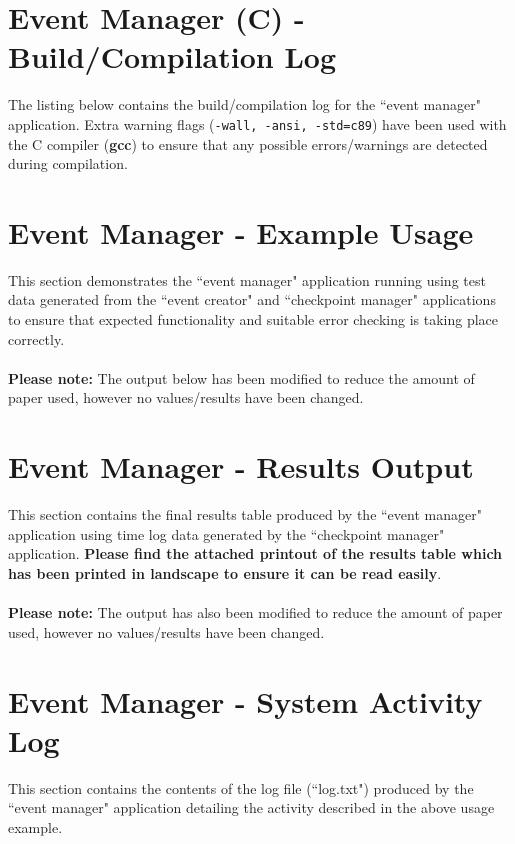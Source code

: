 \documentclass[a4paper, 10pt]{article}
\begin{document}
\clearpage
\section{Event Manager (C) - Build/Compilation Log}

The listing below contains the build/compilation log for the ``event manager" application. Extra warning flags (\verb+-wall, -ansi, -std=c89+) have been used with the C compiler (\textbf{gcc}) to ensure that any possible errors/warnings are detected during compilation. \\



\clearpage
\section{Event Manager - Example Usage}
This section demonstrates the ``event manager" application running using test data generated from the ``event creator" and ``checkpoint manager" applications to ensure that expected functionality and suitable error checking is taking place correctly.\\\\
\textbf{Please note:} The output below has been modified to reduce the amount of paper used, however no values/results have been changed.



\clearpage
\section{Event Manager - Results Output}
This section contains the final results table produced by the ``event manager" application using time log data generated by the ``checkpoint manager" application. \textbf{Please find the attached printout of the results table which has been printed in landscape to ensure it can be read easily}.\\\\
\textbf{Please note:} The output has also been modified to reduce the amount of paper used, however no values/results have been changed.

\clearpage
\section{Event Manager - System Activity Log}
This section contains the contents of the log file (``log.txt") produced by the ``event manager" application detailing the activity described in the above usage example.
\end{document}
